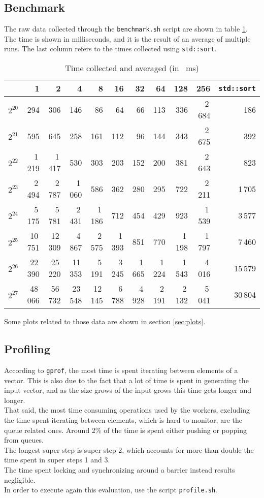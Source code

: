 \documentclass[]{article}
\def\code#1{\texttt{#1}}
\begin{document}
\subsection{Benchmark}
\label{sec:benchmark}
The raw data collected through the \code{benchmark.sh} script are shown in table \ref{tab:benchmark}. The time is shown in milliseconds, and it is the result of an average of multiple runs. The last column refers to the times collected using \code{std::sort}.
\begin{table}[H]
	\centering
	\begin{tabular}{l|*{10}r}
		\toprule
		\diagbox{$n$}{$\mathit{nw}$} 
		& 1 & 2 & 4 & 8 & 16 & 32 & 64 & 128 & 256 & \code{std::sort} \\
		\midrule
		$2^{20}$ & 294 & 306 & 146 & 86 & 64 & 66 & 113 & 336 & 2\,684 & 186 \\
		$2^{21}$ & 595 & 645 & 258 & 161 & 112 & 96 & 144 & 343  & 2\,675 & 392 \\
		$2^{22}$ & 1\,219 & 1\,417 & 530 & 303 & 203 & 152 & 200  & 381 & 2\,643 & 823 \\
		$2^{23}$ & 2\,494 & 2\,787 & 1\,060 & 586 & 362 & 280 & 295 & 722 & 2\,211  & 1\,705 \\
		$2^{24}$ & 5\,175 & 5\,781 & 2\,431 & 1\,186 & 712 & 454 & 429 & 923 & 1\,539 & 3\,577 \\
		$2^{25}$ & 10\,751 & 12\,309 & 4\,867 & 2\,575 & 1\,393 & 851 & 770 & 1\,198 & 1\,797 & 7\,460 \\
		$2^{26}$ & 22\,390 & 25\,220 & 11\,353 & 5\,191& 3\,245 & 1\,665 & 1\,224 & 1\,543 & 4\,016 & 15\,579 \\
		$2^{27}$ & 48\,066 & 56\,732 & 23\,548 & 12\,145 & 6\,788 & 4\,928 & 2\,191 & 2\,132 & 5\,041 & 30\,804 \\
		
		\bottomrule
	\end{tabular}%
	\caption{Time collected and averaged (in \SI{}{\milli \second})}
	\label{tab:benchmark}
\end{table}%
Some plots related to those data are shown in section \ref{sec:plots}.


\subsection{Profiling}
\label{sec:profile}
According to \code{gprof}, the most time is spent iterating between elements of a vector. This is also due to the fact that a lot of time is spent in generating the input vector, and as the size grows of the input grows this time gets longer and longer. \\
That said, the most time consuming operations used by the workers, excluding the time spent iterating between elements, which is hard to monitor, are the queue related ones.
Around 2\% of the time is spent either pushing or popping from queues. \\
The longest super step is super step 2, which accounts for more than double the time spent in super steps 1 and 3.\\
The time spent locking and synchronizing around a barrier instead results negligible. \\
In order to execute again this evaluation, use the script \code{profile.sh}.
\end{document}
